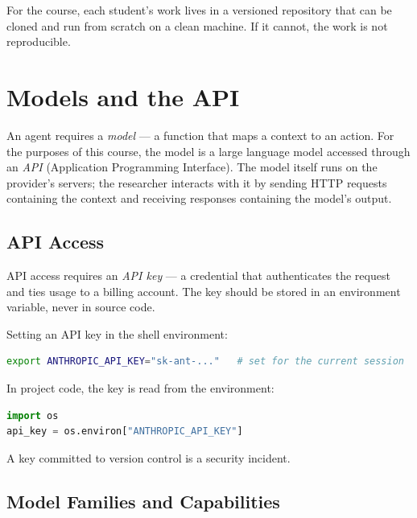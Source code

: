 For the course, each student's work lives in a versioned repository that can be cloned and run from scratch on a clean machine.
If it cannot, the work is not reproducible.

\section{Models and the API}
\label{section:Models}

An agent requires a \emph{model} — a function that maps a context to an action.
For the purposes of this course, the model is a large language model accessed through an \emph{API} (Application Programming Interface).
The model itself runs on the provider's servers; the researcher interacts with it by sending HTTP requests containing the context and receiving responses containing the model's output.

\subsection{API Access}

API access requires an \emph{API key} — a credential that authenticates the request and ties usage to a billing account.
The key should be stored in an environment variable, never in source code.

\begin{example}
Setting an API key in the shell environment:
\begin{lstlisting}[language=bash]
export ANTHROPIC_API_KEY="sk-ant-..."   # set for the current session
\end{lstlisting}
In project code, the key is read from the environment:
\begin{lstlisting}[language=python]
import os
api_key = os.environ["ANTHROPIC_API_KEY"]
\end{lstlisting}
A key committed to version control is a security incident.
\end{example}

\subsection{Model Families and Capabilities}

